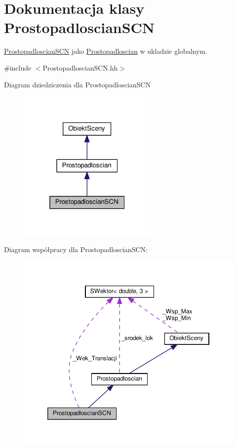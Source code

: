 \hypertarget{classProstopadloscianSCN}{}\section{Dokumentacja klasy Prostopadloscian\+S\+CN}
\label{classProstopadloscianSCN}


\hyperlink{classProstopadloscianSCN}{Prostopadloscian\+S\+CN} jako \hyperlink{classProstopadloscian}{Prostopadloscian} w ukladzie globalnym.  




{\ttfamily \#include $<$Prostopadloscian\+S\+C\+N.\+hh$>$}



Diagram dziedziczenia dla Prostopadloscian\+S\+CN
\nopagebreak
\begin{figure}[H]
\begin{center}
\leavevmode
\includegraphics[width=193pt]{classProstopadloscianSCN__inherit__graph}
\end{center}
\end{figure}


Diagram współpracy dla Prostopadloscian\+S\+CN\+:
\nopagebreak
\begin{figure}[H]
\begin{center}
\leavevmode
\includegraphics[width=346pt]{classProstopadloscianSCN__coll__graph}
\end{center}
\end{figure}
